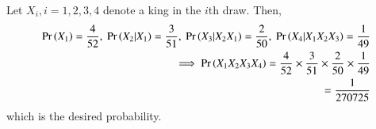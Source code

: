 Let $X_i, i = 1,2,3,4$ denote a king in the $i$th draw.
Then,
\begin{align}
	\Pr\left(X_{1}\right)=\frac{4}{52},\
\Pr\left(X_{2}|X_{1}\right) =\frac{3}{51},\
	\Pr\left(X_{3}|X_{2}X_{1}\right)=\frac{2}{50},\
	\Pr\left(X_{4}|X_{1}X_{2}X_{3}\right) =\frac{1}{49}
	\\
	\implies \Pr\left(X_{1}X_{2}X_{3}X_{4}\right)  
                                     = \frac{4}{52} \times \frac{3}{51} \times \frac{2}{50} \times \frac{1}{49} \\
                                     = \frac{1}{270725}
\end{align}
which is the desired probability.
